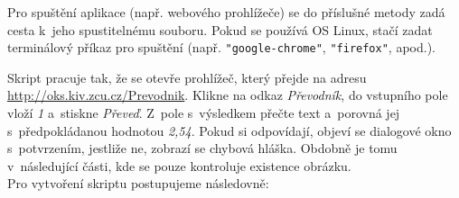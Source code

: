 		Pro spuštění aplikace (např. webového prohlížeče) se do příslušné metody zadá cesta k~jeho spustitelnému souboru. Pokud se používá OS Linux, stačí zadat terminálový příkaz pro spuštění (např. \texttt{"google-chrome"}, \texttt{"firefox"}, apod.).
		
		Skript pracuje tak, že se otevře prohlížeč, který přejde na adresu \url{http://oks.kiv.zcu.cz/Prevodnik}. Klikne na odkaz \emph{Převodník}, do vstupního pole vloží \emph{1} a~stiskne \emph{Převeď}. Z~pole s~výsledkem přečte text a~porovná jej s~předpokládanou hodnotou \emph{2,54}. Pokud si odpovídají, objeví se dialogové okno s~potvrzením, jestliže ne, zobrazí se chybová hláška. Obdobně je tomu v~následující části, kde se pouze kontroluje existence obrázku.
		\\[\topsep]Pro vytvoření skriptu postupujeme následovně:
		\vspace{-\topsep}
